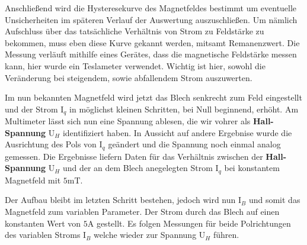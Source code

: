 Anschließend wird die Hysteresekurve %
des Magnetfeldes bestimmt um eventuelle Unsicherheiten im späteren Verlauf der Auswertung auszuschließen. Um nämlich Aufschluss über das 
tatsächliche Verhältnis von Strom zu Feldstärke zu bekommen, muss eben diese Kurve gekannt werden, mitsamt  Remanenzwert. %
Die Messung verläuft mithilfe eines Gerätes, dass die magnetische Feldstärke messen kann, hier wurde ein Teslameter verwendet.   
Wichtig ist hier, sowohl die Veränderung bei steigendem, sowie abfallendem Strom auszuwerten.  \\ \flushleft

Im nun bekannten Magnetfeld wird jetzt das Blech senkrecht zum Feld eingestellt und der Strom $\text{I}_q$ in möglichst kleinen Schritten, bei Null beginnend, erhöht. 
Am Multimeter lässt sich nun eine Spannung ablesen, die wir vohrer als \textbf{Hall-Spannung} $\text{U}_H$  identifiziert haben. In Aussicht auf andere Ergebnise 
wurde die Ausrichtung des Pols von $\text{I}_q$ geändert und die Spannung noch einmal analog gemessen. Die Ergebnisse liefern Daten für das Verhältnis zwischen 
der \textbf{Hall-Spannung} $\text{U}_H$ und der an dem Blech anegelegten Strom $\text{I}_q$ bei konstantem Magnetfeld mit $5$m$\si{\tesla}$.\\ \flushleft

Der Aufbau bleibt im letzten Schritt bestehen, jedoch wird nun $\text{I}_B$ und somit das Magnetfeld zum variablen Parameter. Der Strom durch das Blech auf einen 
konstanten Wert von $5\si{\ampere}$ gestellt. Es folgen Messungen für beide Polrichtungen des variablen Stroms $\text{I}_B$ welche wieder zur Spannung $\text{U}_H$ führen.
                                                                                                                    
                                                      